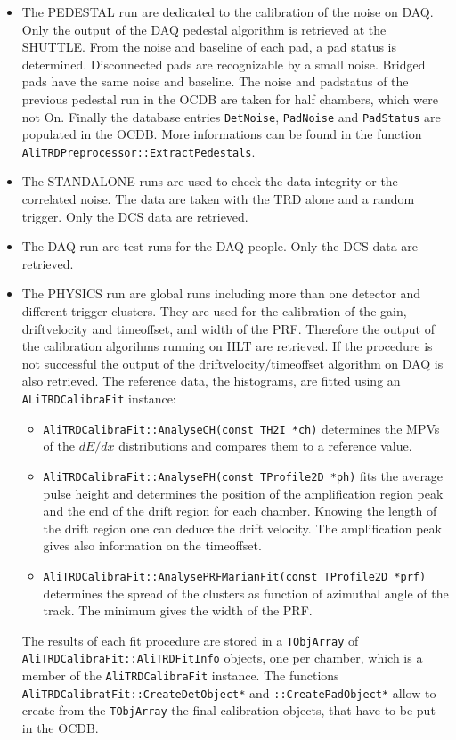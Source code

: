 \documentclass{alicetdr}
\begin{document}
\begin{itemize}
\item The PEDESTAL run are dedicated to the calibration of the noise
on DAQ. Only the output of the DAQ pedestal algorithm is retrieved at
the SHUTTLE. From the noise and baseline of each pad, a pad status is
determined. Disconnected pads are recognizable by a small noise.
Bridged pads have the same noise and baseline. The noise and
padstatus of the previous pedestal run in the OCDB are taken for half
chambers, which were not On. Finally the database entries
{\tt DetNoise}, {\tt PadNoise} and {\tt PadStatus} are populated in
the OCDB. More informations can be found in the function
\\{\tt AliTRDPreprocessor::ExtractPedestals}.
\item The STANDALONE runs are used to check the data integrity or the
correlated noise. The data are taken with the TRD alone and a random
trigger. Only the DCS data are retrieved.
\item The DAQ run are test runs for the DAQ people. Only the DCS data
are retrieved.
\item The PHYSICS run are global runs including more than one detector
and different trigger clusters. They are used for the calibration of
the gain, driftvelocity and timeoffset, and width of the PRF. Therefore
the output of the calibration algorihms running on HLT are retrieved.
If the procedure is not successful the output of the
driftvelocity$/$timeoffset algorithm on DAQ is also retrieved. The
reference data, the histograms, are fitted using an
{\tt ALiTRDCalibraFit} instance:
\begin{itemize}
\item {\tt AliTRDCalibraFit::AnalyseCH(const TH2I *ch)} determines
the MPVs of the $dE/dx$ distributions and compares them to a reference
value.
\item {\tt AliTRDCalibraFit::AnalysePH(const TProfile2D *ph)} fits
the average pulse height and determines the position of the amplification
region peak and the end of the drift region for each chamber. Knowing
the length of the drift region one can deduce the drift velocity. The
amplification peak gives also information on the timeoffset.
\item {\tt AliTRDCalibraFit::AnalysePRFMarianFit(const TProfile2D *prf)}
determines the spread of the clusters as function of azimuthal angle of
the track. The minimum gives the width of the PRF.
\end{itemize}
The results of each fit procedure are stored in a {\tt TObjArray} of
\\{\tt AliTRDCalibraFit::AliTRDFitInfo} objects, one per chamber, which
is a member of the {\tt AliTRDCalibraFit} instance. The functions
{\tt AliTRDCalibratFit::CreateDetObject*} and {\tt ::CreatePadObject*}
allow to create from the {\tt TObjArray} the final calibration objects,
that have to be put in the OCDB.
\end{itemize}
\end{document}
